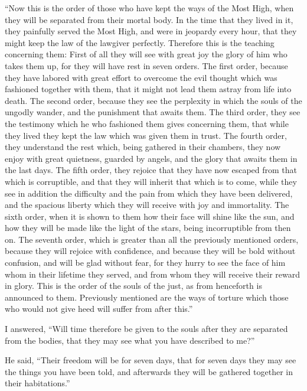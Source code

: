  ``Now this is the order of those who have kept the ways of
the Most High, when they will be separated from their mortal body.
 In the time that they lived in it, they painfully served
the Most High, and were in jeopardy every hour, that they might keep the
law of the lawgiver perfectly.  Therefore this is the
teaching concerning them:  First of all they will see with
great joy the glory of him who takes them up, for they will have rest in
seven orders.  The first order, because they have labored
with great effort to overcome the evil thought which was fashioned
together with them, that it might not lead them astray from life into
death.  The second order, because they see the perplexity
in which the souls of the ungodly wander, and the punishment that awaits
them.  The third order, they see the testimony which he who
fashioned them gives concerning them, that while they lived they kept
the law which was given them in trust.  The fourth order,
they understand the rest which, being gathered in their chambers, they
now enjoy with great quietness, guarded by angels, and the glory that
awaits them in the last days.  The fifth order, they
rejoice that they have now escaped from that which is corruptible, and
that they will inherit that which is to come, while they see in addition
the difficulty and the pain from which they have been delivered, and the
spacious liberty which they will receive with joy and immortality.
 The sixth order, when it is shown to them how their face
will shine like the sun, and how they will be made like the light of the
stars, being incorruptible from then on.  The seventh
order, which is greater than all the previously mentioned orders,
because they will rejoice with confidence, and because they will be bold
without confusion, and will be glad without fear, for they hurry to see
the face of him whom in their lifetime they served, and from whom they
will receive their reward in glory.  This is the order of
the souls of the just, as from henceforth is announced to them.
Previously mentioned are the ways of torture which those who would not
give heed will suffer from after this.''

 I answered, ``Will time therefore be given to the souls
after they are separated from the bodies, that they may see what you
have described to me?''

 He said, ``Their freedom will be for seven days, that for
seven days they may see the things you have been told, and afterwards
they will be gathered together in their habitations.''

